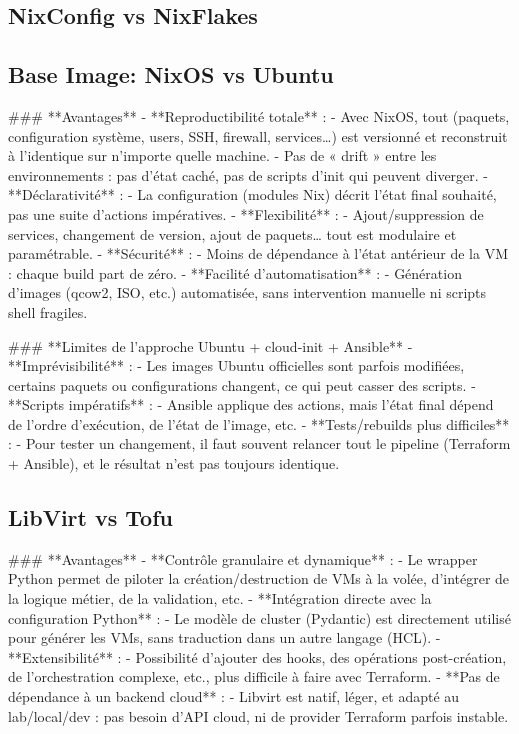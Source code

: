 \subsection{NixConfig vs NixFlakes}

\subsection{Base Image: NixOS vs Ubuntu}

### **Avantages**
- **Reproductibilité totale** :
- Avec NixOS, tout (paquets, configuration système, users, SSH, firewall, services…) est versionné et reconstruit à l'identique sur n'importe quelle machine.
- Pas de « drift » entre les environnements : pas d'état caché, pas de scripts d'init qui peuvent diverger.
- **Déclarativité** :
- La configuration (modules Nix) décrit l'état final souhaité, pas une suite d'actions impératives.
- **Flexibilité** :
- Ajout/suppression de services, changement de version, ajout de paquets… tout est modulaire et paramétrable.
- **Sécurité** :
- Moins de dépendance à l'état antérieur de la VM : chaque build part de zéro.
- **Facilité d'automatisation** :
- Génération d'images (qcow2, ISO, etc.) automatisée, sans intervention manuelle ni scripts shell fragiles.

### **Limites de l'approche Ubuntu + cloud-init + Ansible**
- **Imprévisibilité** :
- Les images Ubuntu officielles sont parfois modifiées, certains paquets ou configurations changent, ce qui peut casser des scripts.
- **Scripts impératifs** :
- Ansible applique des actions, mais l'état final dépend de l'ordre d'exécution, de l'état de l'image, etc.
- **Tests/rebuilds plus difficiles** :
- Pour tester un changement, il faut souvent relancer tout le pipeline (Terraform + Ansible), et le résultat n'est pas toujours identique.


\subsection{LibVirt vs Tofu}

### **Avantages**
- **Contrôle granulaire et dynamique** :
- Le wrapper Python permet de piloter la création/destruction de VMs à la volée, d'intégrer de la logique métier, de la validation, etc.
- **Intégration directe avec la configuration Python** :
- Le modèle de cluster (Pydantic) est directement utilisé pour générer les VMs, sans traduction dans un autre langage (HCL).
- **Extensibilité** :
- Possibilité d'ajouter des hooks, des opérations post-création, de l'orchestration complexe, etc., plus difficile à faire avec Terraform.
- **Pas de dépendance à un backend cloud** :
- Libvirt est natif, léger, et adapté au lab/local/dev : pas besoin d'API cloud, ni de provider Terraform parfois instable.

